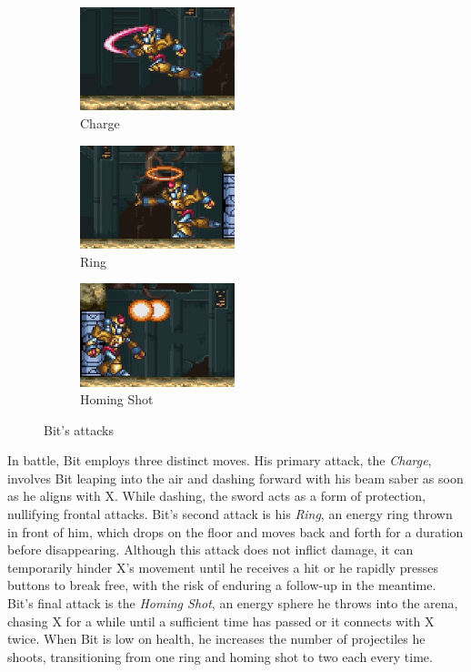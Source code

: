 \begin{figure}[htp]
	\centering
	\begin{subfigure}{.4\linewidth}
		\centering
		\includegraphics[height=3cm]{figures/X3/Enemies/bit_saber.jpg}
		\caption{Charge}
	\end{subfigure}
	\begin{subfigure}{.4\linewidth}
		\centering
		\includegraphics[height=3cm]{figures/X3/Enemies/bit_ring.jpg}
		\caption{Ring}
	\end{subfigure}
	\begin{subfigure}{.4\linewidth}
		\centering
		\includegraphics[height=3cm]{figures/X3/Enemies/bit_shot.jpg}
		\caption{Homing Shot}
	\end{subfigure}
	\caption{Bit's attacks}
\end{figure}

In battle, Bit employs three distinct moves. His primary attack, the \emph{Charge}, involves Bit leaping into the air and dashing forward with his beam saber as soon as he aligns with X. While dashing, the sword acts as a form of protection, nullifying frontal attacks. Bit's second attack is his \emph{Ring}, an energy ring thrown in front of him, which drops on the floor and moves back and forth for a duration before disappearing. Although this attack does not inflict damage, it can temporarily hinder X's movement until he receives a hit or he rapidly presses buttons to break free, with the risk of enduring a follow-up in the meantime. Bit's final attack is the \emph{Homing Shot}, an energy sphere he throws into the arena, chasing X for a while until a sufficient time has passed or it connects with X twice. When Bit is low on health, he increases the number of projectiles he shoots, transitioning from one ring and homing shot to two each every time.


